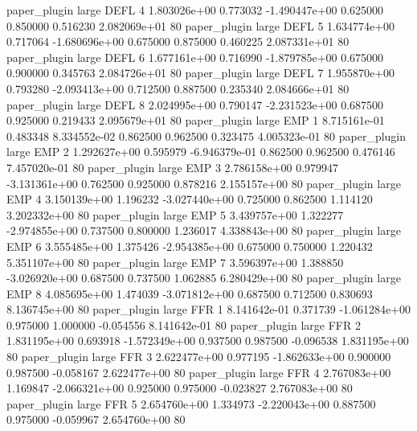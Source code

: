        paper_plugin      large     DEFL                 4 1.803026e+00      0.773032 -1.490447e+00 0.625000 0.850000       0.516230 2.082069e+01 80
       paper_plugin      large     DEFL                 5 1.634774e+00      0.717064 -1.680696e+00 0.675000 0.875000       0.460225 2.087331e+01 80
       paper_plugin      large     DEFL                 6 1.677161e+00      0.716990 -1.879785e+00 0.675000 0.900000       0.345763 2.084726e+01 80
       paper_plugin      large     DEFL                 7 1.955870e+00      0.793280 -2.093413e+00 0.712500 0.887500       0.235340 2.084666e+01 80
       paper_plugin      large     DEFL                 8 2.024995e+00      0.790147 -2.231523e+00 0.687500 0.925000       0.219433 2.095679e+01 80
       paper_plugin      large      EMP                 1 8.715161e-01      0.483348  8.334552e-02 0.862500 0.962500       0.323475 4.005323e-01 80
       paper_plugin      large      EMP                 2 1.292627e+00      0.595979 -6.946379e-01 0.862500 0.962500       0.476146 7.457020e-01 80
       paper_plugin      large      EMP                 3 2.786158e+00      0.979947 -3.131361e+00 0.762500 0.925000       0.878216 2.155157e+00 80
       paper_plugin      large      EMP                 4 3.150139e+00      1.196232 -3.027440e+00 0.725000 0.862500       1.114120 3.202332e+00 80
       paper_plugin      large      EMP                 5 3.439757e+00      1.322277 -2.974855e+00 0.737500 0.800000       1.236017 4.338843e+00 80
       paper_plugin      large      EMP                 6 3.555485e+00      1.375426 -2.954385e+00 0.675000 0.750000       1.220432 5.351107e+00 80
       paper_plugin      large      EMP                 7 3.596397e+00      1.388850 -3.026920e+00 0.687500 0.737500       1.062885 6.280429e+00 80
       paper_plugin      large      EMP                 8 4.085695e+00      1.474039 -3.071812e+00 0.687500 0.712500       0.830693 8.136745e+00 80
       paper_plugin      large      FFR                 1 8.141642e-01      0.371739 -1.061284e+00 0.975000 1.000000      -0.054556 8.141642e-01 80
       paper_plugin      large      FFR                 2 1.831195e+00      0.693918 -1.572349e+00 0.937500 0.987500      -0.096538 1.831195e+00 80
       paper_plugin      large      FFR                 3 2.622477e+00      0.977195 -1.862633e+00 0.900000 0.987500      -0.058167 2.622477e+00 80
       paper_plugin      large      FFR                 4 2.767083e+00      1.169847 -2.066321e+00 0.925000 0.975000      -0.023827 2.767083e+00 80
       paper_plugin      large      FFR                 5 2.654760e+00      1.334973 -2.220043e+00 0.887500 0.975000      -0.059967 2.654760e+00 80
